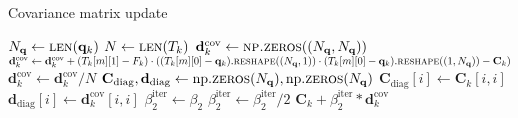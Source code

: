\begin{algorithm}[H]%
\caption{\label{updateCovAlg}Covariance matrix update}
\begin{algorithmic}[1]
\State $N_\mathbf{q}\gets \Call{len}{\mathbf{q}_k}$
\State $N\gets \Call{len}{T_k}$
\State $\mathbf{d}^\mathrm{cov}_k \gets \Call{np.zeros}{(N_\mathbf{q}, N_\mathbf{q})}$
\State $\mathbf{d}^\mathrm{cov}_k \gets \mathbf{d}^\mathrm{cov}_k + (T_k[m][1]-F_k)\cdot((T_k[m][0]-\mathbf{q}_k).\Call{reshape}{(N_\mathbf{q},1)}\cdot(T_k[m][0]-\mathbf{q}_k).\Call{reshape}{(1,N_\mathbf{q})}-\mathbf{C}_k)$
\EndFor
\State $\mathbf{d}^\mathrm{cov}_k \gets \mathbf{d}^\mathrm{cov}_k/N$
\State \label{CDiagDDiagBegin} $\mathbf{C}_\mathrm{diag}, \mathbf{d}_\mathrm{diag}\gets\mathrm{np.}\Call{zeros}{N_\mathbf{q}}, \mathrm{np.}\Call{zeros}{N_\mathbf{q}}$
\State $\mathbf{C}_\mathrm{diag}[i]\gets\mathbf{C}_k[i, i]$
\State \label{CDiagDDiagEnd}$\mathbf{d}_\mathrm{diag}[i]\gets\mathbf{d}^\mathrm{cov}_k[i, i]$
\EndFor
\State $\beta^\mathrm{iter}_2\gets\beta_2$
\State $\beta^\mathrm{iter}_2 \gets \beta^\mathrm{iter}_2/2$
\EndWhile
\State \Return $\mathbf{C}_k+\beta^\mathrm{iter}_2*\mathbf{d}^\mathrm{cov}_k$
\EndFunction
\end{algorithmic}
\end{algorithm}

